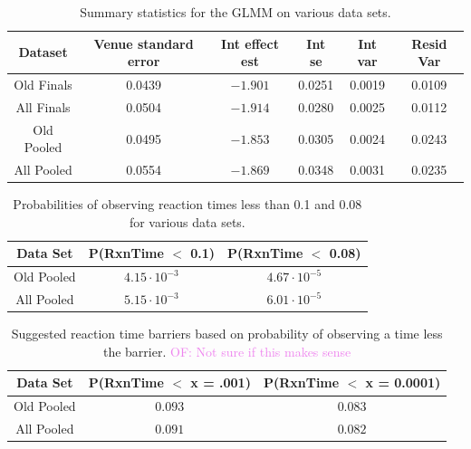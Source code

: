 \documentclass[12pt, letterpaper, titlepage]{article}
\newcommand{\of}[1]{\textcolor{violet}{OF: #1}}
\begin{document}
\begin{table}
  \centering
  \caption{Summary statistics for the GLMM on various data sets.} 
  \begin{tabular}{c c c c c c}
      \toprule
      Dataset & Venue standard error & Int effect est & Int se & Int var & Resid Var \\
      \midrule
      Old Finals & 0.0439 & $-1.901$ & 0.0251 & 0.0019 & 0.0109 \\
      All Finals & 0.0504 & $-1.914$ & 0.0280 & 0.0025 & 0.0112 \\
      Old Pooled & 0.0495 & $-1.853$ & 0.0305 & 0.0024 & 0.0243 \\
      All Pooled & 0.0554 & $-1.869$ & 0.0348 & 0.0031 & 0.0235 \\
      \bottomrule
  \end{tabular}
  \label{tab:Gamma_parameters}
\end{table}

\begin{table}
  \centering
  \caption{Probabilities of observing reaction times less than 0.1 and 0.08
  for various data sets.}
  \begin{tabular}{c c c} 
   \toprule
   Data Set & P(RxnTime $<$ 0.1) & P(RxnTime $<$ 0.08) \\ 
   \midrule
   Old Pooled & $4.15\cdot10^{-3}$ & $4.67\cdot10^{-5}$ \\ 
   All Pooled & $5.15\cdot10^{-3}$ & $6.01\cdot10^{-5}$ \\
   \bottomrule
  \end{tabular}
  \label{tab:Sim_probability}
\end{table}

\begin{table}
  \centering
  \caption{Suggested reaction time barriers based on probability of observing
  a time less the barrier. \of{Not sure if this makes sense}}
  \begin{tabular}{c c c} 
   \toprule
   Data Set & P(RxnTime $<$ x = .001) & P(RxnTime $<$ x = 0.0001) \\ 
   \midrule
   Old Pooled & $0.093$ & $0.083$ \\ 
   All Pooled & $0.091$ & $0.082$ \\
   \bottomrule
  \end{tabular}
  \label{tab:Sim_time}
\end{table}
\end{document}
